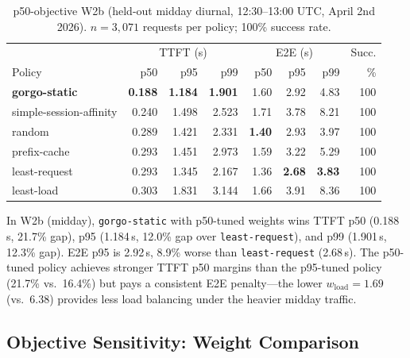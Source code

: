 \documentclass{article}
\begin{document}
\begin{table}[t]
\centering
\small
\caption{p50-objective W2b (held-out midday diurnal, 12:30--13:00 UTC, April 2nd 2026).
  $n{=}3{,}071$ requests per policy; 100\% success rate.}
\label{tab:w2b_p50}
\begin{tabular}{lrrr|rrr|r}
\toprule
 & \multicolumn{3}{c|}{TTFT (s)} & \multicolumn{3}{c|}{E2E (s)} & Succ. \\
Policy & p50 & p95 & p99 & p50 & p95 & p99 & \% \\
\midrule
\textbf{gorgo-static}    & \textbf{0.188} & \textbf{1.184} & \textbf{1.901} & 1.60 & 2.92          & 4.83          & 100 \\
simple-session-affinity   & 0.240          & 1.498          & 2.523          & 1.71 & 3.78          & 8.21          & 100 \\
random                    & 0.289          & 1.421          & 2.331          & \textbf{1.40} & 2.93          & 3.97          & 100 \\
prefix-cache              & 0.293          & 1.451          & 2.973          & 1.59 & 3.22          & 5.29          & 100 \\
least-request             & 0.293          & 1.345          & 2.167          & 1.36 & \textbf{2.68} & \textbf{3.83} & 100 \\
least-load                & 0.303          & 1.831          & 3.144          & 1.66 & 3.91          & 8.36          & 100 \\
\bottomrule
\end{tabular}
\end{table}

In W2b (midday), \texttt{gorgo-static} with p50-tuned weights wins TTFT p50
(0.188\,s, 21.7\% gap), p95 (1.184\,s, 12.0\% gap over \texttt{least-request}),
and p99 (1.901\,s, 12.3\% gap). E2E p95 is 2.92\,s, 8.9\% worse than
\texttt{least-request} (2.68\,s). The p50-tuned policy achieves stronger TTFT
p50 margins than the p95-tuned policy (21.7\% vs.\ 16.4\%) but pays a
consistent E2E penalty---the lower $w_{\mathrm{load}}{=}1.69$ (vs.\ 6.38)
provides less load balancing under the heavier midday traffic.

\subsection{Objective Sensitivity: Weight Comparison}
\label{sec:results:objective}
\end{document}
